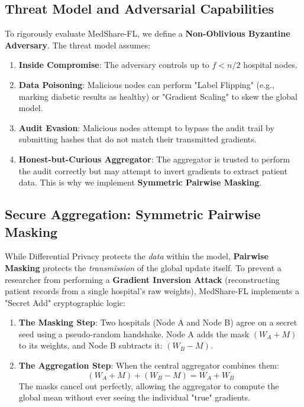 \documentclass[10pt, a4paper, twocolumn]{article}
\begin{document}
\subsection{Threat Model and Adversarial Capabilities}
To rigorously evaluate MedShare-FL, we define a \textbf{Non-Oblivious Byzantine Adversary}. The threat model assumes:
\begin{enumerate}
    \item \textbf{Inside Compromise}: The adversary controls up to $f < n/2$ hospital nodes.
    \item \textbf{Data Poisoning}: Malicious nodes can perform "Label Flipping" (e.g., marking diabetic results as healthy) or "Gradient Scaling" to skew the global model.
    \item \textbf{Audit Evasion}: Malicious nodes attempt to bypass the audit trail by submitting hashes that do not match their transmitted gradients.
    \item \textbf{Honest-but-Curious Aggregator}: The aggregator is trusted to perform the audit correctly but may attempt to invert gradients to extract patient data. This is why we implement \textbf{Symmetric Pairwise Masking}.
\end{enumerate}

\subsection{Secure Aggregation: Symmetric Pairwise Masking}
While Differential Privacy protects the \textit{data} within the model, \textbf{Pairwise Masking} protects the \textit{transmission} of the global update itself. To prevent a researcher from performing a \textbf{Gradient Inversion Attack} (reconstructing patient records from a single hospital's raw weights), MedShare-FL implements a "Secret Add" cryptographic logic:

\begin{enumerate}
    \item \textbf{The Masking Step}: Two hospitals (Node A and Node B) agree on a secret seed using a pseudo-random handshake. Node A adds the mask $(W_A + M)$ to its weights, and Node B subtracts it: $(W_B - M)$.
    \item \textbf{The Aggregation Step}: When the central aggregator combines them:
    \begin{equation}
        (W_A + M) + (W_B - M) = W_A + W_B
    \end{equation}
    The masks cancel out perfectly, allowing the aggregator to compute the global mean without ever seeing the individual "true" gradients.
\end{enumerate}
\end{document}
